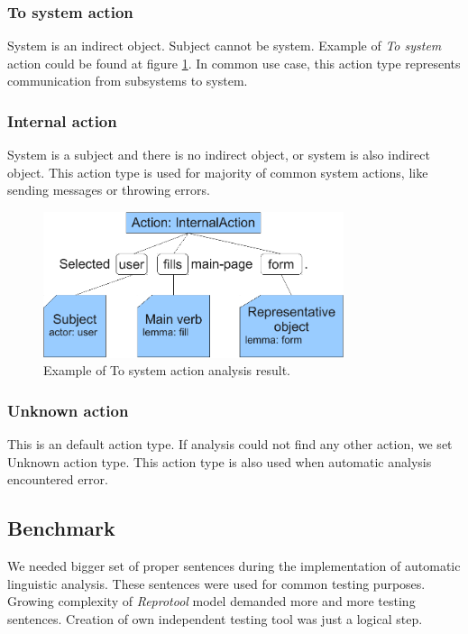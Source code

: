 \subsubsection{To system action}
System is an indirect object. Subject cannot be system. Example of \emph{To system} action could be found at figure \ref{fig:ToSystemActionExample}. In common use case, this action type represents communication from subsystems to system.

\subsubsection{Internal action}
System is a subject and there is no indirect object, or system is also indirect object. This action type is used for majority of common system actions, like sending messages or throwing errors.

\begin{figure}[ht]
  \centering
  \includegraphics[width=250pt]{images/ToSystemActionExample}
  \caption{Example of To system action analysis result.}
  \label{fig:ToSystemActionExample}
\end{figure}

\subsubsection{Unknown action}
This is an default action type. If analysis could not find any other action, we set Unknown action type. This action type is also used when automatic analysis encountered error. 

\subsection{Benchmark}
\label{sec:benchmark}

We needed bigger set of proper sentences during the implementation of automatic linguistic analysis. These sentences were used for common testing purposes. Growing complexity of \emph{Reprotool} model demanded more and more testing sentences. Creation of own independent testing tool was just a logical step.

